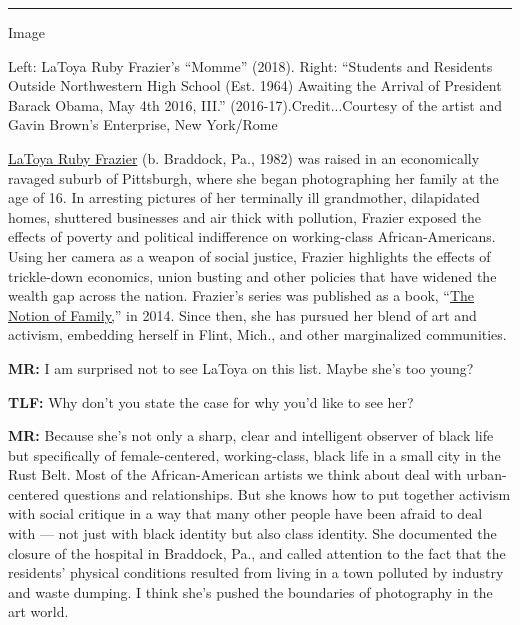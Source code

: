 \begin{center}\rule{0.5\linewidth}{\linethickness}\end{center}

Image

Left: LaToya Ruby Frazier's ``Momme'' (2018). Right: ``Students and
Residents Outside Northwestern High School (Est. 1964) Awaiting the
Arrival of President Barack Obama, May 4th 2016, III.''
(2016-17).Credit...Courtesy of the artist and Gavin Brown's Enterprise,
New York/Rome

\href{https://www.nytimes.com/2018/10/17/t-magazine/carrie-mae-weems-influence-latoya-ruby-frazier-laurie-simmons.html}{LaToya
Ruby Frazier} (b. Braddock, Pa., 1982) was raised in an economically
ravaged suburb of Pittsburgh, where she began photographing her family
at the age of 16. In arresting pictures of her terminally ill
grandmother, dilapidated homes, shuttered businesses and air thick with
pollution, Frazier exposed the effects of poverty and political
indifference on working-class African-Americans. Using her camera as a
weapon of social justice, Frazier highlights the effects of trickle-down
economics, union busting and other policies that have widened the wealth
gap across the nation. Frazier's series was published as a book,
``\href{https://lens.blogs.nytimes.com/2014/10/14/latoya-ruby-fraziers-notion-of-family/}{The
Notion of Family,}'' in 2014. Since then, she has pursued her blend of
art and activism, embedding herself in Flint, Mich., and other
marginalized communities.

\textbf{MR:} I am surprised not to see LaToya on this list. Maybe she's
too young?

\textbf{TLF:} Why don't you state the case for why you'd like to see
her?

\textbf{MR:} Because she's not only a sharp, clear and intelligent
observer of black life but specifically of female-centered,
working-class, black life in a small city in the Rust Belt. Most of the
African-American artists we think about deal with urban-centered
questions and relationships. But she knows how to put together activism
with social critique in a way that many other people have been afraid to
deal with --- not just with black identity but also class identity. She
documented the closure of the hospital in Braddock, Pa., and called
attention to the fact that the residents' physical conditions resulted
from living in a town polluted by industry and waste dumping. I think
she's pushed the boundaries of photography in the art world.

